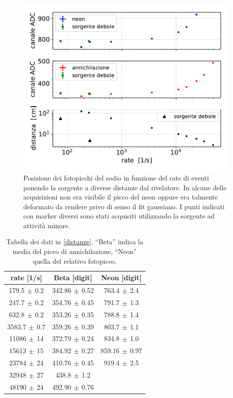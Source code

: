 \begin{figure}[h]
\centering
\includegraphics[width=28 em]{immagini/naforte}
\caption{Posizione dei fotopicchi del sodio in funzione del rate di eventi ponendo la sorgente a diverse distanze dal rivelatore. In alcune delle acquisizioni non era visibile il picco del neon oppure era talmente deformato da rendere privo di senso il fit gaussiano. I punti indicati con marker diversi sono stati acquisiti utilizzando la sorgente ad attività minore.}
\label{distanze}
\end{figure}

\begin{table}[h]
\centering
\begin{tabular}{c|c|c}
rate [1/s] & Beta [digit] & Neon [digit] \\
\hline
 179.5$\,\pm\,$0.2 & 342.86$\,\pm\,$0.52 & 763.4$\,\pm\,$2.4 \\
 247.7$\,\pm\,$0.2 & 354.76$\,\pm\,$0.45 & 791.7$\,\pm\,$1.3 \\
 632.8$\,\pm\,$0.2 & 353.26$\,\pm\,$0.35 & 788.8$\,\pm\,$1.4 \\
3583.7$\,\pm\,$0.7 & 359.26$\,\pm\,$0.39 & 803.7$\,\pm\,$1.1 \\
  11086$\,\pm\,$14 & 372.79$\,\pm\,$0.24 & 834.8$\,\pm\,$1.0 \\
  15613$\,\pm\,$15 & 384.92$\,\pm\,$0.27 & 859.16$\,\pm\,$0.97 \\
  23784$\,\pm\,$24 & 410.76$\,\pm\,$0.45 & 919.4$\,\pm\,$2.5 \\
  32948$\,\pm\,$27 & 438.8$\,\pm\,$1.2 &         \\
  48190$\,\pm\,$24 & 492.90$\,\pm\,$0.76 &        
\end{tabular}

\caption{Tabella dei dati in \autoref{distanze}. ``Beta'' indica la media del picco di annichilazione, ``Neon'' quella del relativo fotopicco.}
\label{tabella forte}
\end{table}

